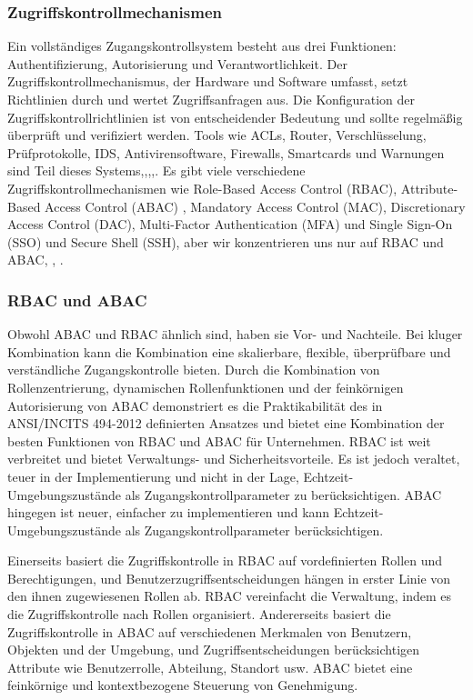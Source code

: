\subsubsection{Zugriffskontrollmechanismen}

Ein vollständiges Zugangskontrollsystem besteht aus drei Funktionen: Authentifizierung, Autorisierung und Verantwortlichkeit. Der Zugriffskontrollmechanismus, der Hardware und Software umfasst, setzt Richtlinien durch und wertet Zugriffsanfragen aus. Die Konfiguration der Zugriffskontrollrichtlinien ist von entscheidender Bedeutung und sollte regelmäßig überprüft und verifiziert werden. Tools wie ACLs, Router, Verschlüsselung, Prüfprotokolle, IDS, Antivirensoftware, Firewalls, Smartcards und Warnungen sind Teil dieses Systems\cite{ouaddah2017access},\cite{vollbrecht2000rfc2904},\cite{boyle2007survey},\cite{hu2011anomaly},\cite{ledru2011validation}.
Es gibt viele verschiedene Zugriffskontrollmechanismen wie Role-Based Access Control (RBAC), Attribute-Based Access Control (ABAC) , Mandatory Access Control (MAC), Discretionary Access Control (DAC), Multi-Factor Authentication (MFA) und Single Sign-On (SSO) und Secure Shell (SSH), aber wir konzentrieren uns nur auf RBAC und ABAC\cite{ouaddah2017access}, \cite{coyne2013abac}, \cite{ameer2022hybrid}\cite{ali2019internet}\cite{dutta2020context}.

\subsubsection{RBAC und ABAC}

Obwohl ABAC und RBAC ähnlich sind, haben sie Vor- und Nachteile. Bei kluger Kombination kann die Kombination eine skalierbare, flexible, überprüfbare und verständliche Zugangskontrolle bieten. Durch die Kombination von Rollenzentrierung, dynamischen Rollenfunktionen und der feinkörnigen Autorisierung von ABAC demonstriert es die Praktikabilität des in ANSI/INCITS 494-2012 definierten Ansatzes und bietet eine Kombination der besten Funktionen von RBAC und ABAC für Unternehmen.
RBAC ist weit verbreitet und bietet Verwaltungs- und Sicherheitsvorteile. Es ist jedoch veraltet, teuer in der Implementierung und nicht in der Lage, Echtzeit-Umgebungszustände als Zugangskontrollparameter zu berücksichtigen. ABAC hingegen ist neuer, einfacher zu implementieren und kann Echtzeit-Umgebungszustände als Zugangskontrollparameter berücksichtigen.

Einerseits basiert die Zugriffskontrolle in RBAC auf vordefinierten Rollen und Berechtigungen, und Benutzerzugriffsentscheidungen hängen in erster Linie von den ihnen zugewiesenen Rollen ab. RBAC vereinfacht die Verwaltung, indem es die Zugriffskontrolle nach Rollen organisiert. Andererseits basiert die Zugriffskontrolle in ABAC auf verschiedenen Merkmalen von Benutzern, Objekten und der Umgebung, und Zugriffsentscheidungen berücksichtigen Attribute wie Benutzerrolle, Abteilung, Standort usw. ABAC bietet eine feinkörnige und kontextbezogene Steuerung von Genehmigung.

